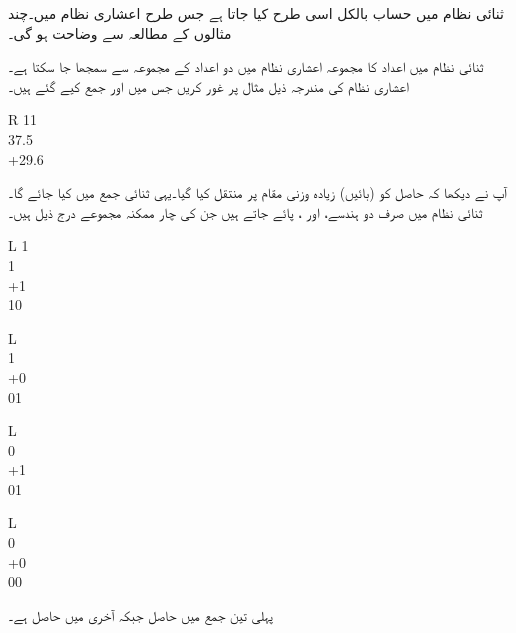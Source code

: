	ثنائی نظام میں حساب بالکل اسی طرح کیا جاتا ہے جس طرح اعشاری نظام میں۔چند مثالوں کے مطالعہ سے وضاحت ہو گی۔
	
	ثنائی نظام میں اعداد کا مجموعہ اعشاری نظام میں دو اعداد کے مجموعہ سے سمجھا جا سکتا ہے۔اعشاری نظام کی مندرجہ ذیل مثال پر غور کریں جس میں  اور  جمع کیے گئے ہیں۔
\begin{center}
\begin{otherlanguage}{english}
\begin{tabular}{R}
11\phantom{.5}\\
37.5\\
+29.6\\
\end{tabular}
\end{otherlanguage}
\end{center}
آپ نے دیکھا کہ حاصل کو (بائیں) زیادہ وزنی مقام پر منتقل کیا گیا۔یہی ثنائی جمع میں کیا جائے گا۔ ثنائی نظام میں صرف دو ہندسے،  اور ، پائے جاتے ہیں جن کی چار ممکنہ مجموعے درج ذیل ہیں۔
\begin{center}
\begin{otherlanguage}{english}
\begin{tabular}{L}
\phantom{1}1\\
\phantom{+}1\\
+1\\
\midrule
\phantom{1}10
\end{tabular}\quad\quad
\begin{tabular}{L}
\phantom{11}\\
\phantom{+}1\\
+0\\
\midrule
\phantom{1}01
\end{tabular}\quad\quad
\begin{tabular}{L}
\phantom{11}\\
\phantom{+}0\\
+1\\
\midrule
\phantom{1}01
\end{tabular}\quad\quad
\begin{tabular}{L}
\phantom{11}\\
\phantom{+}0\\
+0\\
\midrule
\phantom{1}00
\end{tabular}
\end{otherlanguage}
\end{center}

پہلی تین جمع میں حاصل  جبکہ آخری میں حاصل  ہے۔

